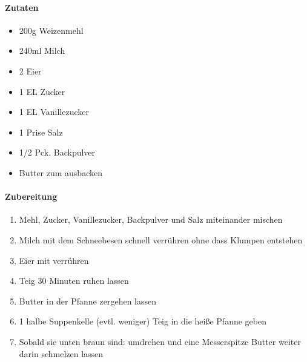\newpage
{}
\paragraph{Zutaten}
\begin{itemize}[noitemsep]
	\item 200g Weizenmehl
	\item 240ml Milch
	\item 2 Eier
	\item 1 EL Zucker
	\item 1 EL Vanillezucker
	\item 1 Prise Salz
	\item 1/2 Pck. Backpulver
	\item Butter zum ausbacken
	
\end{itemize}
\paragraph{Zubereitung}
\begin{enumerate}[noitemsep]
	\item Mehl, Zucker, Vanillezucker, Backpulver und Salz miteinander mischen
	\item Milch mit dem Schneebesen schnell verrühren ohne dass Klumpen entstehen
	\item Eier mit verrühren
	\item Teig 30 Minuten ruhen lassen
	\item Butter in der Pfanne zergehen lassen 
	\item 1 halbe Suppenkelle (evtl. weniger) Teig in die heiße Pfanne geben 
	\item Sobald sie unten braun sind: umdrehen und eine Messerspitze Butter weiter darin schmelzen lassen
\end{enumerate}